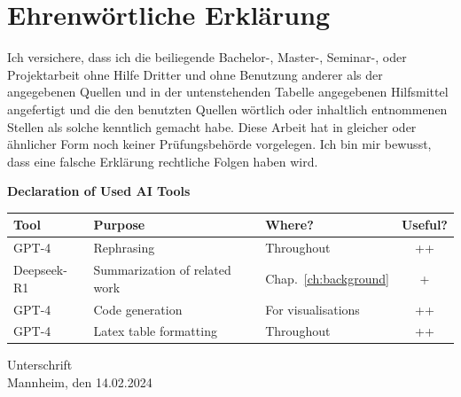 \documentclass[a4paper,oneside,bibliography=totoc]{scrbook}
\begin{document}
\backmatter
\chapter{Ehrenwörtliche Erklärung}

Ich versichere, dass ich die beiliegende Bachelor-, Master-, Seminar-, oder
Projektarbeit ohne Hilfe Dritter und ohne Benutzung anderer als der angegebenen
Quellen und in der untenstehenden Tabelle angegebenen Hilfsmittel angefertigt
und die den benutzten Quellen wörtlich oder inhaltlich entnommenen Stellen als
solche kenntlich gemacht habe. Diese Arbeit hat in gleicher oder ähnlicher Form
noch keiner Prüfungsbehörde vorgelegen. Ich bin mir bewusst, dass eine falsche
Erklärung rechtliche Folgen haben wird.

\begin{center}
  \textbf{Declaration of Used AI Tools} \\[.3em]
  \begin{tabularx}{\textwidth}{lXlc}
    \toprule
    Tool & Purpose & Where? & Useful? \\
    \midrule
    GPT-4 & Rephrasing & Throughout & ++ \\
    Deepseek-R1 & Summarization of related work & Chap.~\ref{ch:background} & + \\
    GPT-4 & Code generation & For visualisations & ++ \\
    GPT-4 & Latex table formatting & Throughout & ++ \\
    \bottomrule
  \end{tabularx}
\end{center}

\vspace{2cm}
\noindent Unterschrift\\
\noindent Mannheim, den 14.02.2024 \hfill
\end{document}
